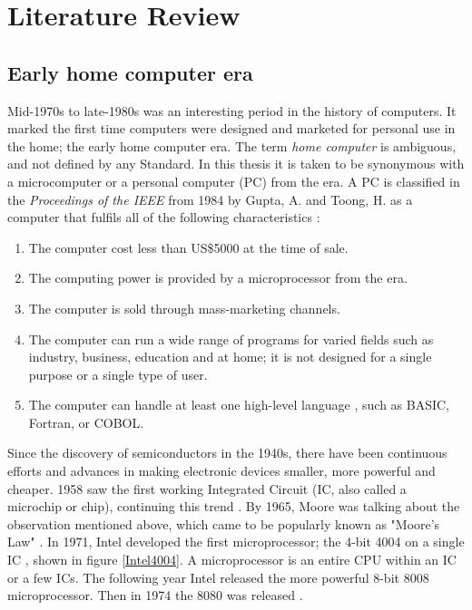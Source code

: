 
\chapter{Literature Review} %
\label{Chapter2} %

\section{Early home computer era} \label{sec: Early home computer era}
 
Mid-1970s to late-1980s was an interesting period in the history of computers. It marked the first time computers were designed and marketed for personal use in the home; the early home computer era. The term \textit{home computer} is ambiguous, and not defined by any Standard. In this thesis it is taken to be synonymous with a microcomputer or a personal computer (PC) from the era. A PC is classified in the \textit{Proceedings of the IEEE} from 1984 by Gupta, A. and Toong, H. as a computer that fulfils all of the following characteristics 
\cite{RN24}: 

\begin{enumerate}
\item The computer cost less than US\$5000 at the time of sale.\\
\item The computing power is provided by a microprocessor from the era. \\
\item The computer is sold through mass-marketing channels. \\
\item The computer can run a wide range of programs for varied fields such as industry, business, education and at home; it is not designed for a single purpose or a single type of user.
\item The computer can handle at least one high-level language , such as BASIC, Fortran, or COBOL.
\end{enumerate}

Since the discovery of semiconductors in the 1940s, there have been continuous efforts and advances in making electronic devices smaller, more powerful and cheaper. 1958 saw the first working Integrated Circuit (IC, also called a microchip or chip), continuing this trend 
\cite{RN36}. By 1965, Moore was talking about the observation mentioned above, which came to be popularly known as "Moore's Law" 
\cite{RN33}. In 1971, Intel developed the first microprocessor; the 4-bit 4004 on a single IC 
\cite{RN37}, shown in figure \ref{Intel4004}. A microprocessor is an entire CPU within an IC or a few ICs. The following year Intel released the more powerful 8-bit 8008 microprocessor. Then in 1974 the 8080 was released 
\cite{RN38}. 

